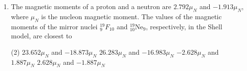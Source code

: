 \begin{enumerate}
 \begin{tasks}(4)
	\task[\textbf{a.}]$\frac{30 A}{60+A^{2 / 3}}$
	\task[\textbf{b.}]$\frac{30 A}{30+A^{2 / 3}}$
	\task[\textbf{c.}]$\frac{60 A}{120+A^{2 / 3}}$
	\task[\textbf{d.}]  $\frac{120 A}{60+A^{2 / 3}}$
\end{tasks}
\item  The magnetic moments of a proton and a neutron are $2.792 \mu_{N}$ and $-1.913 \mu_{N}$, where $\mu_{N}$ is the nucleon magnetic moment. The values of the magnetic moments of the mirror nuclei ${ }_{9}^{19} F_{10}$ and ${ }_{10}^{19} \mathrm{Ne}_{9}$, respectively, in the Shell model, are closest to
 \begin{tasks}(2)
	\task[\textbf{a.}]$23.652 \mu_{N}$ and $-18.873 \mu_{N}$
	\task[\textbf{b.}]$26.283 \mu_{N}$ and $-16.983 \mu_{N}$
	\task[\textbf{c.}]$-2.628 \mu_{N}$ and $1.887 \mu_{N}$
	\task[\textbf{d.}]  $2.628 \mu_{N}$ and $-1.887 \mu_{N}$
\end{tasks}









\end{enumerate}